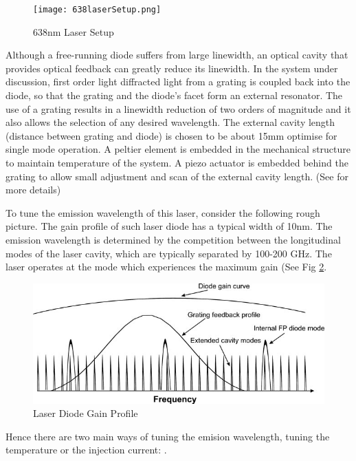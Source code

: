 \documentclass[12pt]{report}
\begin{document}
\begin{figure}[H]
    \centering
    \texttt{[image: 638laserSetup.png]}
    \caption{638nm Laser Setup}
    \label{fig:638laserSetup}
\end{figure}

Although a free-running diode suffers from large linewidth, an optical cavity that provides optical feedback can greatly reduce its linewidth. In the system under discussion, first order light diffracted light from a grating is coupled back into the diode, so that the grating and the diode's facet form an external resonator. The use of a grating results in a linewidth reduction of two orders of magnitude and it also allows the selection of any desired wavelength. The external cavity length (distance between grating and diode) is chosen to be about 15mm optimise for single mode operation. A peltier element is embedded in the mechanical structure to maintain temperature of the system. A piezo actuator is embedded behind the grating to allow small adjustment and scan of the external cavity length. (See \cite{compactGratingDiodeLaser} for more details)
\par
To tune the emission wavelength of this laser, consider the following rough picture. The gain profile of such laser diode has a typical width of 10nm. The emission wavelength is determined by the competition between the longitudinal modes of the laser cavity, which are typically separated by 100-200 GHz. The laser operates at the mode which experiences the maximum gain (See Fig \ref{fig:diodeLaserGainCurve}.
\begin{figure}[H]
    \centering
    \includegraphics[width=.8\textwidth]{diodeLaserGainCurve.jpg}
    \caption{Laser Diode Gain Profile}
    \label{fig:diodeLaserGainCurve}
\end{figure}
Hence there are two main ways of tuning the emision wavelength, tuning the temperature or the injection current: \cite{compactGratingDiodeLaser}. 
\end{document}
